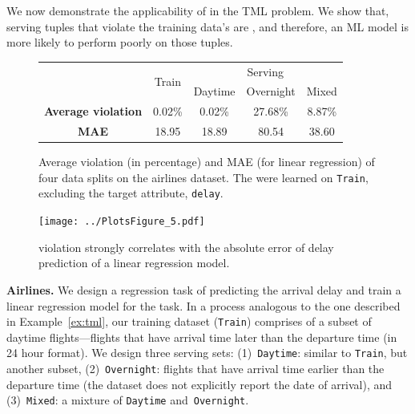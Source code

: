  We now demonstrate the applicability of \dis in the TML problem.
We show that, serving tuples that violate the training data's \dis are \nc, and
therefore, an ML model is more likely to perform poorly on those tuples.


\smallskip

\begin{figure}[t!]
	\centering
	\setlength{\tabcolsep}{5pt}
	\renewcommand\arraystretch{0.88}
	\small{
	\begin{tabular}{ccccc}
		\hline
		&  \multirow{ 2}{*}{Train} & \multicolumn{3}{c}{Serving}\\
		\cline{3-5}
		&& Daytime & Overnight & Mixed \\
		\midrule
		\textbf{Average violation} & 0.02\% & 0.02\% & 27.68\% & 8.87\%\\
		\textbf{MAE} & 18.95	 &  18.89 & 80.54 & 38.60\\
		\bottomrule
		
	\end{tabular}
	}
		\vspace{-3mm}	
	 \caption{Average \invariant violation (in percentage) and MAE (for linear regression) 
	 of four data splits on the airlines dataset. The \invariants were learned on
 	 \texttt{Train}, excluding the target attribute, \texttt{delay}.}
	 
	\label{fig:airlines-summary}
	\vspace{2mm}
	\centering
	\texttt{[image: ../PlotsFigure\_5.pdf]}
	\vspace{-3mm}	
	\caption{\Invariant violation strongly correlates with the absolute error
	 of delay prediction of a linear regression model.}
	 \vspace{2mm}	
	\label{fig:airlines}
\end{figure}


\noindent \textbf{Airlines.} We design a regression task of predicting the
arrival delay and train a linear regression model for the task.  In
a process analogous to the one described in Example~\ref{ex:tml}, our training
dataset (\texttt{Train}) comprises of a subset of daytime flights---flights
that have arrival time later than the departure time (in 24 hour format). We
design three serving sets: (1)~\texttt{Daytime}: similar to \texttt{Train}, but
another subset, (2)~\texttt{Overnight}: flights that have arrival time earlier
than the departure time (the dataset does not explicitly report the date of
arrival), and (3)~\texttt{Mixed}: a mixture of \texttt{Daytime}
and~\texttt{Overnight}. 

